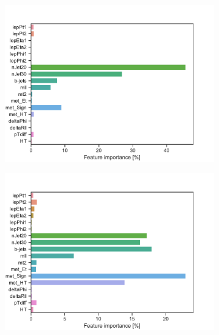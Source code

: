 \begin{figure}[H]
    \centering
    \begin{subfigure}[t!]{0.49\textwidth}
        \includegraphics[width = \textwidth]{Figures/SlepSlep/ML/BDT/All_level/Low/featureImportance.pdf}
        \caption{}
        \label{fig:featSlepslepLow}
    \end{subfigure}
    \begin{subfigure}[t!]{0.49\textwidth}
        \includegraphics[width = \textwidth]{Figures/SlepSnu/BDT/All_level/Low/featureImportance.pdf}
        \caption{}
        \label{fig:featSlepsnuLow}
    \end{subfigure}
    \begin{subfigure}[t!]{0.49\textwidth}

\end{subfigure}
\end{figure}
